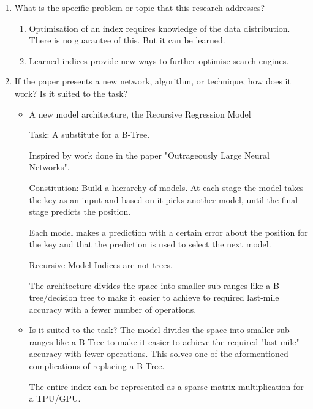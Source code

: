 \documentclass[presentation]{beamer}
\begin{document}
\begin{enumerate}
\item What is the specific problem or topic that this research addresses?
\begin{enumerate}
\item Optimisation of an index requires \alert{knowledge} of the data distribution. There is no guarantee of this. But it can be learned.
\item Learned indices provide new ways to further optimise search engines.
\end{enumerate}

\item If the paper presents a new network, algorithm, or technique, how does it work?
Is it suited to the task?

\begin{itemize}
\item A new model architecture, the Recursive Regression Model

Task: A substitute for a B-Tree.

Inspired by work done in the paper "Outrageously Large Neural Networks".

Constitution:
Build a hierarchy of models.
At each stage the model takes the key as an input and based on it picks another model, until the final stage predicts the position.

Each model makes a prediction with a certain error about the position for the key and that the prediction is used to select the next model.

Recursive Model Indices are \alert{not trees}.

The architecture divides the space into smaller sub-ranges like a B-tree/decision tree to make it easier to achieve to required last-mile accuracy with a fewer number of operations.

\item Is it suited to the task?
The model divides the space into smaller sub-ranges like a B-Tree to make it easier to achieve the required "last mile" accuracy with fewer operations.
This solves one of the aformentioned complications of replacing a B-Tree.

The entire index can be represented as a sparse matrix-multiplication for a TPU/GPU.
\end{itemize}
\end{enumerate}
\end{document}
